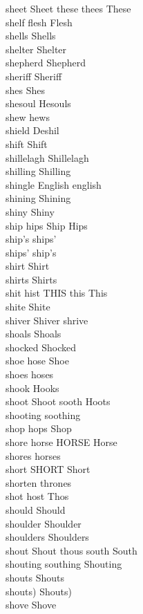 sheet Sheet these thees These\\
shelf flesh Flesh\\
shells Shells\\
shelter Shelter\\
shepherd Shepherd\\
sheriff Sheriff\\
shes Shes\\
shesoul Hesouls\\
shew hews\\
shield Deshil\\
shift Shift\\
shillelagh Shillelagh\\
shilling Shilling\\
shingle English english\\
shining Shining\\
shiny Shiny\\
ship hips Ship Hips\\
ship's ships'\\
ships' ship's\\
shirt Shirt\\
shirts Shirts\\
shit hist THIS this This\\
shite Shite\\
shiver Shiver shrive\\
shoals Shoals\\
shocked Shocked\\
shoe hose Shoe\\
shoes hoses\\
shook Hooks\\
shoot Shoot sooth Hoots\\
shooting soothing\\
shop hops Shop\\
shore horse HORSE Horse\\
shores horses\\
short SHORT Short\\
shorten thrones\\
shot host Thos\\
should Should\\
shoulder Shoulder\\
shoulders Shoulders\\
shout Shout thous south South\\
shouting southing Shouting\\
shouts Shouts\\
shouts) Shouts)\\
shove Shove\\
